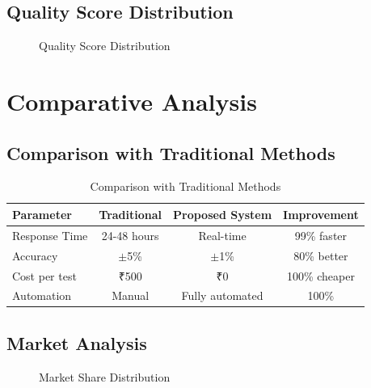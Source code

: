 \documentclass[12pt,a4paper]{article}
\begin{document}
\subsection{Quality Score Distribution}
\begin{figure}[H]
\centering
{}
\caption{Quality Score Distribution}
\label{fig:quality_dist}
\end{figure}

\section{Comparative Analysis}

\subsection{Comparison with Traditional Methods}
\begin{table}[H]
\centering
\begin{tabular}{lccc}
\toprule
\textbf{Parameter} & \textbf{Traditional} & \textbf{Proposed System} & \textbf{Improvement} \\
\midrule
Response Time & 24-48 hours & Real-time & 99\% faster \\
Accuracy & $\pm$5\% & $\pm$1\% & 80\% better \\
Cost per test & ₹500 & ₹0 & 100\% cheaper \\
Automation & Manual & Fully automated & 100\% \\
\bottomrule
\end{tabular}
\caption{Comparison with Traditional Methods}
\label{tab:comparison}
\end{table}

\subsection{Market Analysis}
\begin{figure}[H]
\centering
{}
\caption{Market Share Distribution}
\label{fig:market_share}
\end{figure}
\end{document}
